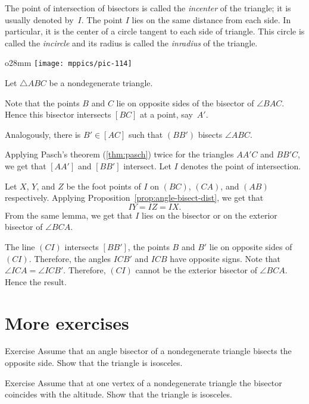 The point of intersection of bisectors is called the \emph{incenter} of the triangle; 
it is usually denoted by~$I$.
The point $I$ lies on the same distance from each side.
In particular, it is the center of a circle tangent to each side of triangle.
This circle is called 
the \emph{incircle} and its radius is called 
the \emph{inradius} of the triangle.


\begin{wrapfigure}{o}{28mm}
\vskip-6mm
\centering
\texttt{[image: mppics/pic-114]}
\end{wrapfigure}

Let $\triangle ABC$ be a nondegenerate triangle.

Note that the points $B$ and $C$ lie on opposite sides of the bisector of $\angle BAC$.
Hence this bisector intersects $[BC]$ at a point, say~$A'$.

Analogously, there is $B'\in[AC]$ 
such that $(BB')$ bisects $\angle ABC$.

Applying Pasch's theorem (\ref{thm:pasch}) twice
for the triangles $AA'C$ and $BB'C$,
we get that $[AA']$ and $[BB']$ intersect.
Let $I$ denotes the point of intersection.

Let $X$, $Y$, and $Z$ be the foot points of $I$ on  $(B C)$, $(C A)$, and $(A B)$ respectively.
Applying Proposition~\ref{prop:angle-bisect-dist}, we get that
$$I Y=I Z=I X.$$
From the same lemma, we get that $I$ lies on the bisector or on the exterior bisector of $\angle B C A$.

The line $(C I)$ intersects $[B B']$,
the points $B$ and $B'$ lie on opposite sides of~$(C I)$.
Therefore, the angles $I C B'$ and $I C B$ have opposite signs.
Note that $\angle I C A=\angle I C B'$.
Therefore, $(C I)$ cannot be the exterior bisector of $\angle B C A$.
Hence the result.
\qeds

\section*{More exercises}

\begin{thm}{Exercise}\label{ex:bisect=median}
Assume that an angle bisector of a nondegenerate triangle bisects the opposite side. 
Show that the triangle is isosceles.
\end{thm}

\begin{thm}{Exercise}\label{ex:bisect=altitude}
Assume that at one vertex of a nondegenerate triangle the bisector coincides with the altitude.
Show that  the triangle is isosceles.
\end{thm}

